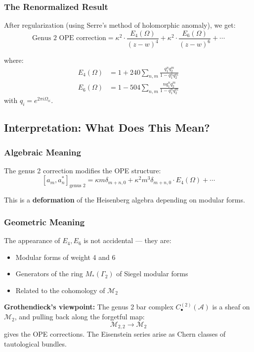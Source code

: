 \subsubsection{The Renormalized Result}

After regularization (using Serre's method of holomorphic anomaly), we get:
$$\boxed{
\text{Genus 2 OPE correction} = 
\kappa^2 \cdot \frac{E_4(\Omega)}{(z-w)^4} 
+ \kappa^2 \cdot \frac{E_6(\Omega)}{(z-w)^6}
+ \cdots
}$$

where:
\begin{align}
E_4(\Omega) &= 1 + 240\sum_{n,m} \frac{q_1^n q_2^m}{1 - q_1^n q_2^m} \\
E_6(\Omega) &= 1 - 504\sum_{n,m} \frac{n q_1^n q_2^m}{1 - q_1^n q_2^m}
\end{align}
with $q_i = e^{2\pi i \Omega_{ii}}$.

\subsection{Interpretation: What Does This Mean?}

\subsubsection{Algebraic Meaning}

The genus 2 correction modifies the OPE structure:
$$[a_m, a^*_n]_{\text{genus 2}} = \kappa m \delta_{m+n,0} 
+ \kappa^2 m^3 \delta_{m+n,0} \cdot E_4(\Omega)
+ \cdots$$

This is a \textbf{deformation} of the Heisenberg algebra depending on modular forms.

\subsubsection{Geometric Meaning}

The appearance of $E_4, E_6$ is not accidental --- they are:
\begin{itemize}
\item Modular forms of weight 4 and 6
\item Generators of the ring $M_*(\Gamma_2)$ of Siegel modular forms
\item Related to the cohomology of $\mathcal{M}_2$
\end{itemize}

\textbf{Grothendieck's viewpoint:} The genus 2 bar complex $C_{\bullet}^{(2)}(\mathcal{A})$
is a sheaf on $\mathcal{M}_2$, and pulling back along the forgetful map:
$$\mathcal{M}_{2,2} \to \mathcal{M}_2$$
gives the OPE corrections. The Eisenstein series arise as Chern classes of tautological
bundles.

